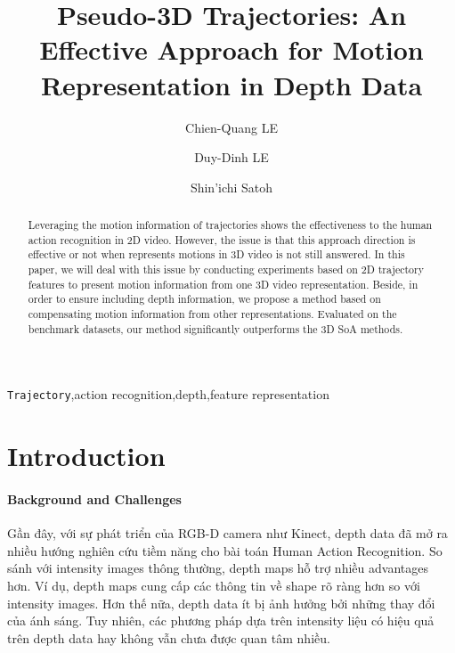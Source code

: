 \documentclass[review]{elsarticle}
\begin{document}
\begin{frontmatter}

\title{Pseudo-3D Trajectories: An Effective Approach for Motion Representation in Depth Data}

\author{Chien-Quang LE}
\address{The Graduate University for Advanced Studies}

\author{Duy-Dinh LE}
\address{National Institute of Informatics}

\author{Shin'ichi Satoh}
\address{National Institute of Informatics}


\begin{abstract}
Leveraging the motion information of trajectories shows the effectiveness to the human action recognition in 2D video. However, the issue is that this approach direction is effective or not when represents motions in 3D video is not still answered. In this paper, we will deal with this issue by conducting experiments based on 2D trajectory features to present motion information from one 3D video representation. Beside, in order to ensure including depth information, we propose a method based on compensating motion information from other representations. Evaluated on the benchmark datasets, our method significantly outperforms the 3D SoA methods.
\end{abstract}

\begin{keyword}
\texttt{Trajectory}\sep action recognition\sep depth\sep feature representation
\end{keyword}

\end{frontmatter}

\linenumbers

\section{Introduction}

\paragraph{Background and Challenges} Gần đây, với sự phát triển của RGB-D camera như Kinect, depth data đã mở ra nhiều hướng nghiên cứu tiềm năng cho bài toán Human Action Recognition. So sánh với intensity images thông thường, depth maps hỗ trợ nhiều advantages hơn. Ví dụ, depth maps cung cấp các thông tin về shape rõ ràng hơn so với intensity images. Hơn thế nữa, depth data ít bị ảnh hưởng bởi những thay đổi của ánh sáng. Tuy nhiên, các phương pháp dựa trên intensity liệu có hiệu quả trên depth data hay không vẫn chưa được quan tâm nhiều.
\end{document}
